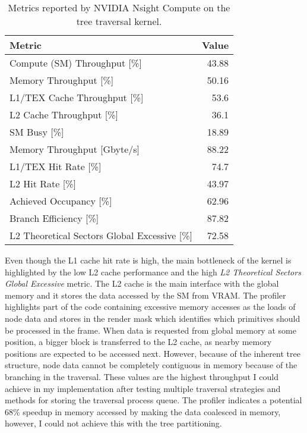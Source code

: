 \begin{table}[H]
\centering
\begin{tabular}{l|r}
\textbf{Metric}                                  & \multicolumn{1}{l}{\textbf{Value}} \\ \hline
Compute (SM) Throughput {[}\%{]}                 & 43.88                              \\
Memory Throughput {[}\%{]}                       & 50.16                              \\
L1/TEX Cache Throughput {[}\%{]}                 & 53.6                               \\
L2 Cache Throughput {[}\%{]}                     & 36.1                               \\
SM Busy {[}\%{]}                                 & 18.89                              \\
Memory Throughput {[}Gbyte/s{]}                  & 88.22                              \\
L1/TEX Hit Rate {[}\%{]}                         & 74.7                               \\
L2 Hit Rate {[}\%{]}                             & 43.97                              \\
Achieved Occupancy {[}\%{]}                      & 62.96                              \\
Branch Efficiency {[}\%{]}                       & 87.82                              \\
L2 Theoretical Sectors Global Excessive {[}\%{]} & 72.58                             
\end{tabular}
\caption{Metrics reported by NVIDIA Nsight Compute on the tree traversal kernel.}
\label{tab:nsight}
\end{table}

Even though the L1 cache hit rate is high, the main bottleneck of the kernel is highlighted by the low L2 cache performance and the high \textit{L2 Theoretical Sectors Global Excessive} metric. The L2 cache is the main interface with the global memory and it stores the data accessed by the SM from VRAM. The profiler highlights part of the code containing excessive memory accesses as the loads of node data and stores in the render mask which identifies which primitives should be processed in the frame. When data is requested from global memory at some position, a bigger block is transferred to the L2 cache, as nearby memory positions are expected to be accessed next. However, because of the inherent tree structure, node data cannot be completely contiguous in memory because of the branching in the traversal. These values are the highest throughput I could achieve in my implementation after testing multiple traversal strategies and methods for storing the traversal process queue. The profiler indicates a potential 68\% speedup in memory accessed by making the data coalesced in memory, however, I could not achieve this with the tree partitioning.

